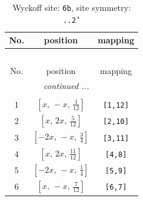 \documentclass[fleqn,8pt]{jsarticle}
\begin{document}
\begin{longtable}{ccc}
\caption{Wyckoff site: {\tt 6b}, site symmetry: {\tt ..2'}}
 \\
 \hline \hline
No. & position & mapping \\ \hline \endfirsthead

\multicolumn{2}{l}{\tablename\ \thetable{}} \\
 \hline \hline
No. & position & mapping \\ \hline \endhead

 \hline \hline
\multicolumn{2}{r}{\footnotesize\it continued ...} \\ \endfoot

 \hline \hline
\multicolumn{2}{r}{} \\ \endlastfoot

1 & $\left[ x,\, - x,\, \frac{1}{12} \right]$ & {\tt [1,12]} \\ \hline
2 & $\left[ x,\, 2 x,\, \frac{5}{12} \right]$ & {\tt [2,10]} \\ \hline
3 & $\left[ - 2 x,\, - x,\, \frac{3}{4} \right]$ & {\tt [3,11]} \\ \hline
4 & $\left[ x,\, 2 x,\, \frac{11}{12} \right]$ & {\tt [4,8]} \\ \hline
5 & $\left[ - 2 x,\, - x,\, \frac{1}{4} \right]$ & {\tt [5,9]} \\ \hline
6 & $\left[ x,\, - x,\, \frac{7}{12} \right]$ & {\tt [6,7]} \\
\end{longtable}
\renewcommand{\arraystretch}{1.2}
\end{document}
